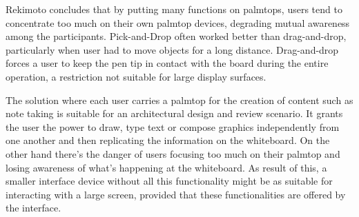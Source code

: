 Rekimoto concludes that by putting many functions on palmtops,
users tend to concentrate too much on their own palmtop devices,
degrading mutual awareness among the participants.
Pick-and-Drop often worked better than drag-and-drop,
particularly when user had to move objects for a long distance.
Drag-and-drop forces a user to keep the pen tip in contact
with the board during the entire operation,
a restriction not suitable for large display surfaces.


The solution where each user carries a palmtop for the creation of content such as note taking
is suitable for an architectural design and review scenario.
It grants the user the power to draw, type text or compose graphics 
independently from one another and then replicating the information on the whiteboard.
On the other hand there's the danger of users focusing too much on their palmtop and losing
awareness of what's happening at the whiteboard.
As result of this, a smaller interface device without all this functionality might be as suitable
for interacting with a large screen, provided that these functionalities are offered by the interface.